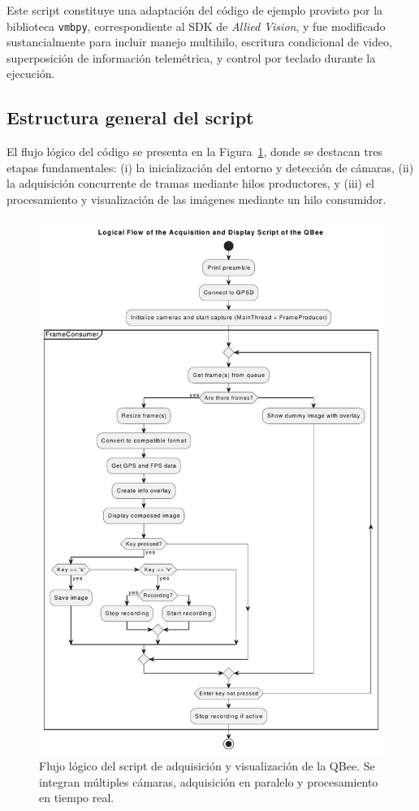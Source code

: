   \noindent Este script constituye una adaptación del código de ejemplo provisto por la biblioteca \texttt{vmbpy}, correspondiente al SDK de \textit{Allied Vision}, y fue modificado sustancialmente para incluir manejo multihilo, escritura condicional de video, superposición de información telemétrica, y control por teclado durante la ejecución.
  
  \subsection{Estructura general del script}
  
  El flujo lógico del código se presenta en la Figura~\ref{fig:diagrama_script}, donde se destacan tres etapas fundamentales: (i) la inicialización del entorno y detección de cámaras, (ii) la adquisición concurrente de tramas mediante hilos productores, y (iii) el procesamiento y visualización de las imágenes mediante un hilo consumidor.
  
  \begin{figure}[!h]
      \centering
      \includegraphics[trim = 0 0 0 1cm, clip, width=1\textwidth]{Figures/C4/OSU_main.pdf}
      \caption{Flujo lógico del script de adquisición y visualización de la QBee. Se integran múltiples cámaras, adquisición en paralelo y procesamiento en tiempo real.}
      \label{fig:diagrama_script}
  \end{figure}
  
